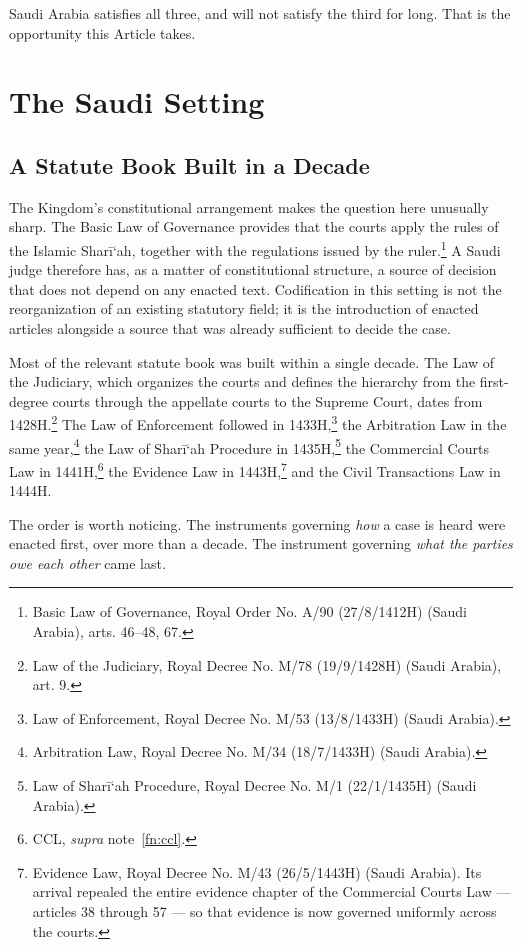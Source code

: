 \documentclass[12pt]{article}
\begin{document}
Saudi Arabia satisfies all three, and will not satisfy the third for
long. That is the opportunity this Article takes.

\section{The Saudi Setting}
\label{sec:setting}

\subsection{A Statute Book Built in a Decade}

The Kingdom's constitutional arrangement makes the question here unusually
sharp. The Basic Law of Governance provides that the courts apply the rules of
the Islamic Shar\=i`ah, together with the regulations issued by the
ruler.\footnote{Basic Law of Governance, Royal Order No. A/90 (27/8/1412H)
(Saudi Arabia), arts. 46--48, 67.} A Saudi judge therefore has, as a matter of
constitutional structure, a source of decision that does not depend on any
enacted text. Codification in this setting is not the reorganization of an
existing statutory field; it is the introduction of enacted articles alongside
a source that was already sufficient to decide the case.

Most of the relevant statute book was built within a single decade. The Law of
the Judiciary, which organizes the courts and defines the hierarchy from the
first-degree courts through the appellate courts to the Supreme Court, dates
from 1428H.\footnote{Law of the Judiciary, Royal Decree No. M/78 (19/9/1428H)
(Saudi Arabia), art. 9.} The Law of Enforcement followed in
1433H,\footnote{Law of Enforcement, Royal Decree No. M/53 (13/8/1433H) (Saudi
Arabia).} the Arbitration Law in the same year,\footnote{Arbitration Law,
Royal Decree No. M/34 (18/7/1433H) (Saudi Arabia).} the Law of Shar\=i`ah
Procedure in 1435H,\footnote{Law of Shar\=i`ah Procedure, Royal Decree No. M/1
(22/1/1435H) (Saudi Arabia).} the Commercial Courts Law in
1441H,\footnote{CCL, \emph{supra} note~\ref{fn:ccl}.} the Evidence Law in
1443H,\footnote{Evidence Law, Royal Decree No. M/43 (26/5/1443H) (Saudi
Arabia). Its arrival repealed the entire evidence chapter of the Commercial
Courts Law --- articles 38 through 57 --- so that evidence is now governed
uniformly across the courts.} and the Civil Transactions Law in 1444H.

The order is worth noticing. The instruments governing \emph{how} a case is
heard were enacted first, over more than a decade. The instrument governing
\emph{what the parties owe each other} came last.
\end{document}
